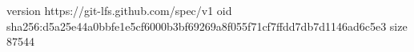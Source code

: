 version https://git-lfs.github.com/spec/v1
oid sha256:d5a25e44a0bbfe1e5cf6000b3bf69269a8f055f71cf7ffdd7db7d1146ad6c5e3
size 87544
